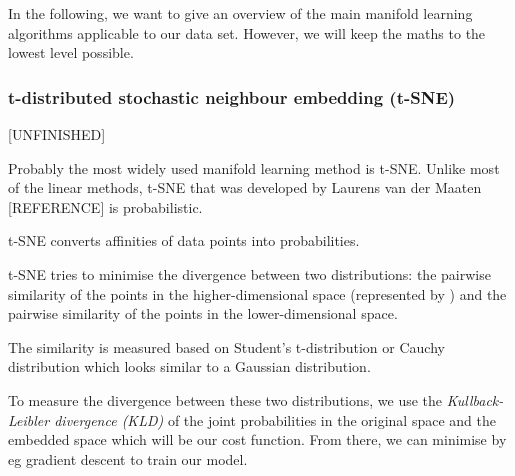 \documentclass[journal, a4paper]{IEEEtran}
\begin{document}
In the following, we want to give an overview of the main manifold learning algorithms applicable to our data set. However, we will keep the maths to the lowest level possible.


\hfill
\subsubsection{t-distributed stochastic neighbour embedding (t-SNE)}
[UNFINISHED]

Probably the most widely used manifold learning method is t-SNE.
Unlike most of the linear methods, t-SNE that was developed by Laurens van der Maaten [REFERENCE] is probabilistic.

t-SNE converts affinities of data points into probabilities. 

t-SNE tries  to minimise the divergence between two distributions: the pairwise similarity of the points in the higher-dimensional space (represented by ) and the pairwise similarity of the points in the lower-dimensional space.

The similarity is measured based on Student's t-distribution or Cauchy distribution which looks similar to a Gaussian distribution.


To measure the divergence between these two distributions, we use the \textit{Kullback-Leibler divergence (KLD)} of the joint probabilities in the original space and the embedded space which will be our cost function. From there, we can minimise by eg gradient descent to train our model.
\end{document}
